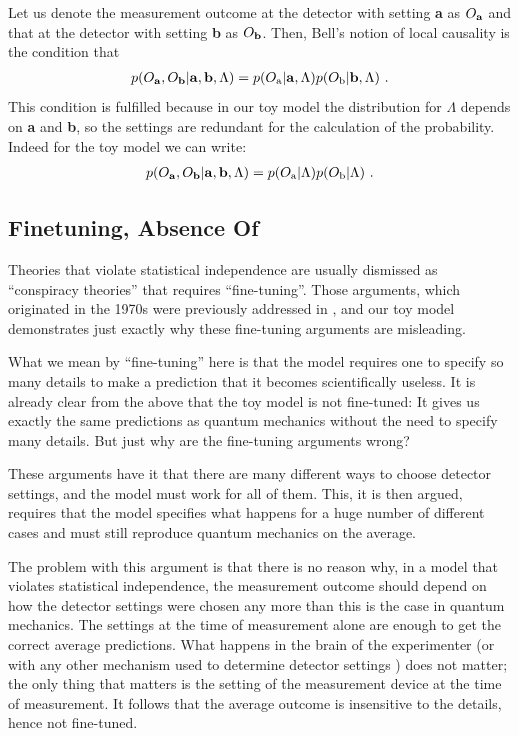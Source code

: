 \documentclass[11pt,twoside,A4]{article}
\def\beqn{\begin{eqnarray}}
\def\eeqn{\end{eqnarray}}
\begin{document}
Let us denote the measurement outcome at the detector with setting {\bf a} as $O_{\rm \bf a}$ and that at the detector with setting {\bf b} as $O_{\rm \bf b}$. 
Then, Bell's notion of local causality is the condition that
\beqn
p(O_{\rm \bf a},O_{\rm \bf b}| {\mathrm {\bf a}}, {\mathrm {\bf b}}, \Lambda)  = p(O_{\bf \rm a}| {\mathrm {\bf a}}, \Lambda) p(O_{\bf \rm b}| {\mathrm {\bf b}}, \Lambda) ~.
\eeqn
This condition is fulfilled because in our toy model the distribution for $\Lambda$ depends on {\bf a} and {\bf b}, so the settings are redundant for the calculation of the probability. Indeed for the toy model we can write:
\beqn
p(O_{\rm \bf a},O_{\rm \bf b}| {\mathrm {\bf a}}, {\mathrm {\bf b}}, \Lambda)  = p(O_{\bf \rm a}| \Lambda) p(O_{\bf \rm b}| \Lambda) ~.
\eeqn

\subsection{Finetuning, Absence Of}
\label{less}



Theories that violate statistical independence are usually dismissed as ``conspiracy theories'' that requires ``fine-tuning''. Those arguments, which originated in the 1970s \cite{SC,Bell77} were previously addressed in \cite{Hossenfelder:2019shy,otherpaper}, and our toy model demonstrates just exactly why these fine-tuning arguments are misleading.

What we mean by ``fine-tuning'' here is that the model requires one to specify so many details to make a prediction that it becomes scientifically useless. It is already clear from the above that the toy model is not fine-tuned: It gives us exactly the same predictions as quantum mechanics without the need to specify many details. But just why are the fine-tuning arguments wrong?

These arguments have it that there are many different ways to choose detector settings, and the model must work for
all of them. This, it is then argued, requires that the model specifies what happens for a huge number of different cases and must still
reproduce quantum mechanics on the average. 

The problem with this argument is that there is no reason why, in a model that violates statistical independence, the measurement outcome should depend on
how the detector settings were chosen any more than this is the case in quantum mechanics. The settings at the time of measurement alone 
are enough to get the correct average predictions. What happens in the brain of the experimenter (or with any other mechanism used to determine detector settings \cite{Leung:2017ndn,bigbell,Friedman:2018byq}) does not matter; the only thing that matters is the setting of the measurement device at the time of measurement. It follows that the average outcome is insensitive to the details, hence not fine-tuned. 
\end{document}
